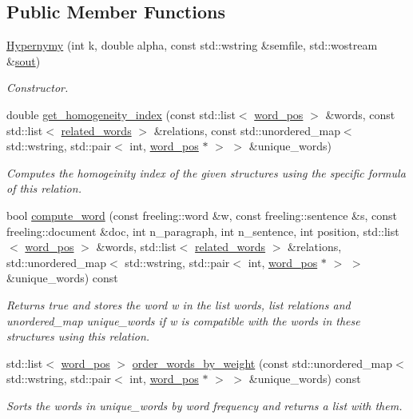 \subsection*{Public Member Functions}
\begin{DoxyCompactItemize}
\item 
\hyperlink{classHypernymy_a763e43dbe511ef68413683bef8203937}{Hypernymy} (int k, double alpha, const std\+::wstring \&semfile, std\+::wostream \&\hyperlink{classRelation_a44deec0ee05d803ea23e14520fd57a75}{sout})
\begin{DoxyCompactList}\small\item\em Constructor. \end{DoxyCompactList}\item 
double \hyperlink{classHypernymy_a597074abd7795e114d13783677e55e20}{get\+\_\+homogeneity\+\_\+index} (const std\+::list$<$ \hyperlink{structword__pos}{word\+\_\+pos} $>$ \&words, const std\+::list$<$ \hyperlink{structrelated__words}{related\+\_\+words} $>$ \&relations, const std\+::unordered\+\_\+map$<$ std\+::wstring, std\+::pair$<$ int, \hyperlink{structword__pos}{word\+\_\+pos} $\ast$ $>$ $>$ \&unique\+\_\+words)
\begin{DoxyCompactList}\small\item\em Computes the homogeinity index of the given structures using the specific formula of this relation. \end{DoxyCompactList}\item 
bool \hyperlink{classHypernymy_a9eb6e16f7b8128b9865c43df41940a77}{compute\+\_\+word} (const freeling\+::word \&w, const freeling\+::sentence \&s, const freeling\+::document \&doc, int n\+\_\+paragraph, int n\+\_\+sentence, int position, std\+::list$<$ \hyperlink{structword__pos}{word\+\_\+pos} $>$ \&words, std\+::list$<$ \hyperlink{structrelated__words}{related\+\_\+words} $>$ \&relations, std\+::unordered\+\_\+map$<$ std\+::wstring, std\+::pair$<$ int, \hyperlink{structword__pos}{word\+\_\+pos} $\ast$ $>$ $>$ \&unique\+\_\+words) const 
\begin{DoxyCompactList}\small\item\em Returns true and stores the word w in the list words, list relations and unordered\+\_\+map unique\+\_\+words if w is compatible with the words in these structures using this relation. \end{DoxyCompactList}\item 
std\+::list$<$ \hyperlink{structword__pos}{word\+\_\+pos} $>$ \hyperlink{classHypernymy_aaa6ac1db9e77a937d38f6e19c550f62f}{order\+\_\+words\+\_\+by\+\_\+weight} (const std\+::unordered\+\_\+map$<$ std\+::wstring, std\+::pair$<$ int, \hyperlink{structword__pos}{word\+\_\+pos} $\ast$ $>$ $>$ \&unique\+\_\+words) const 
\begin{DoxyCompactList}\small\item\em Sorts the words in unique\+\_\+words by word frequency and returns a list with them. \end{DoxyCompactList}\end{DoxyCompactItemize}

